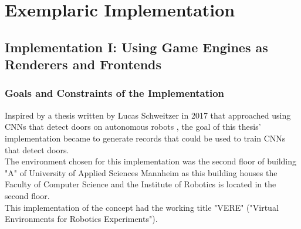 \chapter{Exemplaric Implementation}
\label{chap:implementations}

\section{Implementation I: Using Game Engines as Renderers and Frontends}
\subsection{Goals and Constraints of the Implementation}
\label{section:goals-and-constraints}
Inspired by a thesis written by Lucas Schweitzer in 2017 that approached using \acsp{CNN} that detect doors on autonomous robots \cite{Schweitzer2017}, the goal of this thesis' implementation became to generate records that could be used to train \acsp{CNN} that detect doors.\\ 
The environment chosen for this implementation was the second floor of building "A" of University of Applied Sciences Mannheim as this building houses the Faculty of Computer Science and the Institute of Robotics is located in the second floor.\\
This implementation of the concept had the working title "VERE" ("Virtual Environments for Robotics Experiments").

